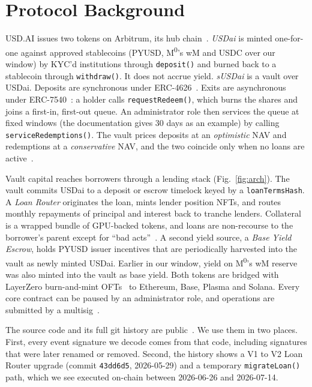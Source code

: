 \section{Protocol Background}\label{sec:background}

USD.AI issues two tokens on Arbitrum, its hub chain~\cite{usdaidocs}. \emph{USDai} is minted one-for-one against approved stablecoins (PYUSD, M\textsuperscript{0}'s wM and USDC over our window) by KYC'd institutions through \texttt{deposit()} and burned back to a stablecoin through \texttt{withdraw()}. It does not accrue yield. \emph{sUSDai} is a vault over USDai. Deposits are synchronous under ERC-4626~\cite{eip4626}. Exits are asynchronous under ERC-7540~\cite{eip7540}: a holder calls \texttt{requestRedeem()}, which burns the shares and joins a first-in, first-out queue. An administrator role then services the queue at fixed windows (the documentation gives 30 days as an example) by calling \texttt{serviceRedemptions()}. The vault prices deposits at an \emph{optimistic} NAV and redemptions at a \emph{conservative} NAV, and the two coincide only when no loans are active~\cite{usdaidocs}.

Vault capital reaches borrowers through a lending stack (Fig.~\ref{fig:arch}). The vault commits USDai to a deposit or escrow timelock keyed by a \texttt{loanTermsHash}. A \emph{Loan Router} originates the loan, mints lender position NFTs, and routes monthly repayments of principal and interest back to tranche lenders. Collateral is a wrapped bundle of GPU-backed tokens, and loans are non-recourse to the borrower's parent except for ``bad acts''~\cite{usdaidocs}. A second yield source, a \emph{Base Yield Escrow}, holds PYUSD issuer incentives that are periodically harvested into the vault as newly minted USDai. Earlier in our window, yield on M\textsuperscript{0}'s wM reserve was also minted into the vault as base yield. Both tokens are bridged with LayerZero burn-and-mint OFTs~\cite{layerzero} to Ethereum, Base, Plasma and Solana. Every core contract can be paused by an administrator role, and operations are submitted by a multisig~\cite{usdaidocs}.

The source code and its full git history are public~\cite{usdaisrc}. We use them in two places. First, every event signature we decode comes from that code, including signatures that were later renamed or removed. Second, the history shows a V1 to V2 Loan Router upgrade (commit \texttt{43dd6d5}, 2026-05-29) and a temporary \texttt{migrateLoan()} path, which we see executed on-chain between 2026-06-26 and 2026-07-14.


